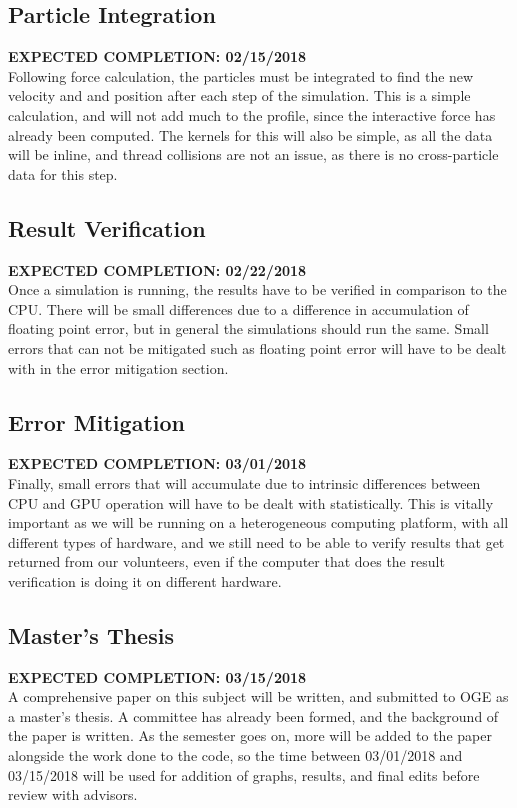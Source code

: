 \documentclass[fleqn,10pt]{SelfArx} %
\begin{document}
\subsection{Particle Integration}
\textbf{EXPECTED COMPLETION: 02/15/2018}\\
Following force calculation, the particles must be integrated to find the new velocity and and position after each step of the simulation. This is a simple calculation, and will not add much to the profile, since the interactive force has already been computed. The kernels for this will also be simple, as all the data will be inline, and thread collisions are not an issue, as there is no cross-particle data for this step.

\subsection{Result Verification}
\textbf{EXPECTED COMPLETION: 02/22/2018}\\
Once a simulation is running, the results have to be verified in comparison to the CPU. There will be small differences due to a difference in accumulation of floating point error, but in general the simulations should run the same. Small errors that can not be mitigated such as floating point error will have to be dealt with in the error mitigation section.

\subsection{Error Mitigation}
\textbf{EXPECTED COMPLETION: 03/01/2018}\\
Finally, small errors that will accumulate due to intrinsic differences between CPU and GPU operation will have to be dealt with statistically. This is vitally important as we will be running on a heterogeneous computing platform, with all different types of hardware, and we still need to be able to verify results that get returned from our volunteers, even if the computer that does the result verification is doing it on different hardware.

\subsection{Master's Thesis}
\textbf{EXPECTED COMPLETION: 03/15/2018}\\
A comprehensive paper on this subject will be written, and submitted to OGE as a master's thesis. A committee has already been formed, and the background of the paper is written. As the semester goes on, more will be added to the paper alongside the work done to the code, so the time between 03/01/2018 and 03/15/2018 will be used for addition of graphs, results, and final edits before review with advisors.
\end{document}
